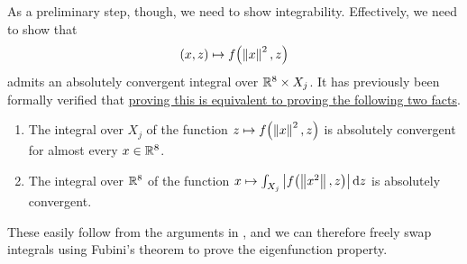 As a preliminary step, though, we need to show integrability. %
    Effectively, we need to show that %
    \begin{align*}
        (x, z) \mapsto f\!\left( \left\lVert x \right\rVert^2, z \right)
    \end{align*}
    admits an absolutely convergent integral over $\mathbb{R}^8 \times X_j$. It has previously been formally verified that \href{https://github.com/leanprover-community/mathlib4/blob/5a2eaa85c555c4263e15928cef249cbaad2eb2d2/Mathlib/MeasureTheory/Integral/Prod.lean#L222-L238}{proving this is equivalent to proving the following two facts}.

    \begin{enumerate}
        \item The integral over $X_j$ of the function $z \mapsto f\!\left( \left\lVert x \right\rVert^2, z \right)$ is absolutely convergent for almost every $x \in \mathbb{R}^8$.
        \item The integral over $\mathbb{R}^8$ of the function $x 
        \mapsto \int_{X_j} \left\lvert f\!\left( \left\lVert x^2 \right\rVert, z \right) \right\rvert \operatorname{d}\!{z}$ is absolutely convergent.
    \end{enumerate}
    These easily follow from the arguments in , and we can therefore freely swap integrals using Fubini's theorem to prove the eigenfunction property.

